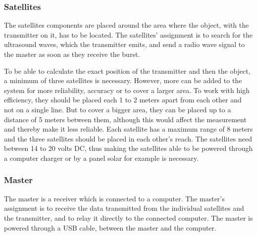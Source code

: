 \subsubsection{Satellites}
The satellites components are placed around the area where the object, with the transmitter on it, has to be located. The satellites' assignment is to search for the ultrasound waves, which the transmitter emits, and send a radio wave signal to the master as soon as they receive the burst.

To be able to calculate the exact position of the transmitter and then the object, a minimum of three satellites is necessary. However, more can be added to the system for more reliability, accuracy or to cover a larger area. To work with high efficiency, they should be placed each 1 to 2 meters apart from each other and not on a single line. But to cover a bigger area, they can be placed up to a distance of 5 meters between them, although this would affect the measurement and thereby make it less reliable. Each satellite has a maximum range of 8 meters and the three satellites should be placed in each other's reach. The satellites need between 14 to 20 volts DC, thus making the satellites able to be powered through a computer charger or by a panel solar for example is necessary.
%
\subsubsection{Master}
The master is a receiver which is connected to a computer. The master's assignment is to receive the data transmitted from the individual satellites and the transmitter, and to relay it directly to the connected computer. The master is powered through a USB cable, between the master and the computer.
%
